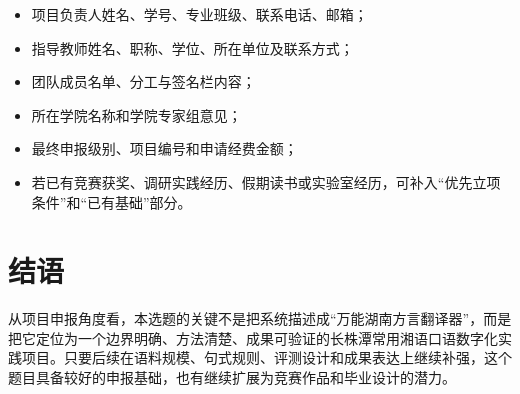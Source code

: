 \documentclass[12pt,a4paper]{ctexart}
\begin{document}
\begin{itemize}
  \item 项目负责人姓名、学号、专业班级、联系电话、邮箱；
  \item 指导教师姓名、职称、学位、所在单位及联系方式；
  \item 团队成员名单、分工与签名栏内容；
  \item 所在学院名称和学院专家组意见；
  \item 最终申报级别、项目编号和申请经费金额；
  \item 若已有竞赛获奖、调研实践经历、假期读书或实验室经历，可补入“优先立项条件”和“已有基础”部分。
\end{itemize}

\section{结语}

从项目申报角度看，本选题的关键不是把系统描述成“万能湖南方言翻译器”，而是把它定位为一个边界明确、方法清楚、成果可验证的长株潭常用湘语口语数字化实践项目。只要后续在语料规模、句式规则、评测设计和成果表达上继续补强，这个题目具备较好的申报基础，也有继续扩展为竞赛作品和毕业设计的潜力。
\end{document}
